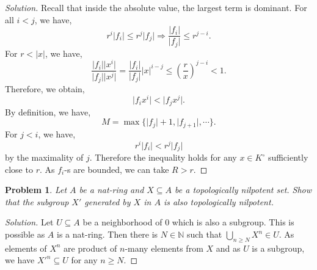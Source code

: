 \documentclass[8pt]{article}
\numberwithin{equation}{section}
\newenvironment{solution}{\begin{proof}[Solution]}{\end{proof}}
\newtheorem{problem}{Problem}[section]
\newcommand{\N}[0]{\mathbb{N}}
\newcommand{\ab}[1]{\vert #1 \vert}
\begin{document}
\begin{solution}
  Recall that inside the absolute value, the largest term is dominant. For all $i<j$, we have,
  \begin{equation*}
    r^i\ab{f_i}\leq r^j\ab{f_j}\Rightarrow {\frac {\ab{f_i}} {\ab{f_j}}}\leq r^{j-i}.
  \end{equation*}
  For $r<\ab{x}$, we have,
  \begin{equation*}
    {\frac {\ab{f_i}\ab{x^i}} {\ab{f_j}\ab{x^j}}} = {\frac {\ab{f_i}} {\ab{f_j}}}\ab{x}^{i-j}\leq \left({\frac {r} {x}}\right)^{j-i}<1.
  \end{equation*}
  Therefore, we obtain,
  \begin{equation*}
    \ab{f_ix^i}<\ab{f_jx^j}.
  \end{equation*}
  By definition, we have,
  \begin{equation*}
    M = \max\{\ab{f_j}+1,\ab{f_{j+1}},\cdots\}.
  \end{equation*}
  For $j<i$, we have,
  \begin{equation*}
    r^i\ab{f_i}<r^j\ab{f_j}
  \end{equation*} 
  by the maximality of $j$. Therefore the inequality holds for any $x\in K^\circ$ sufficiently close to $r$. As $f_i$-s are bounded, we can take $R>r$.
\end{solution}
\begin{problem}
  Let $A$ be a nat-ring and $X\subseteq A$ be a topologically nilpotent set. Show that the subgroup $X'$ generated by $X$ in $A$ is also topologically nilpotent.
\end{problem}
\begin{solution}
  Let $U\subseteq A$ be a neighborhood of $0$ which is also a subgroup. This is possible as $A$ is a nat-ring. Then there is $N\in\N$ such that $\bigcup_{n\geq N}X^n\in U$. As elements of $X^n$ are product of $n$-many elements from $X$ and as $U$ is a subgroup, we have ${X'}^n\subseteq U$ for any $n\geq N$.
\end{solution}
\end{document}
